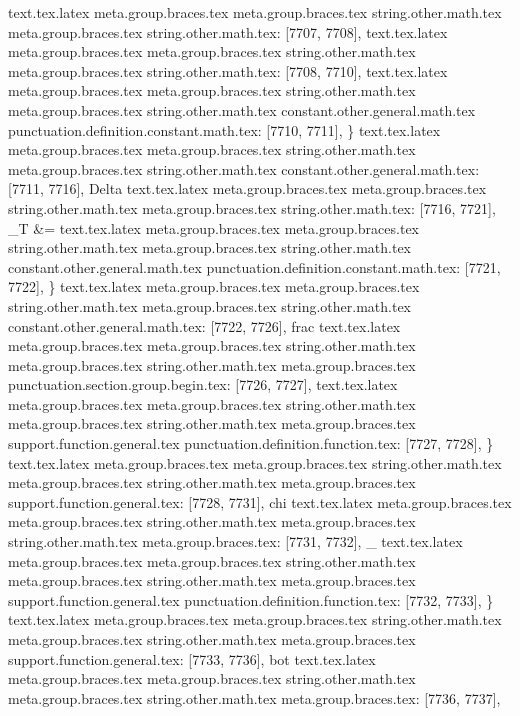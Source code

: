 {{{{{{{{{{{{{{{{{{{{{{{{{{{{{{{{{{{{{{{{{{{{{{{{{{{{{{{{{{{{{{{{{{{{{{{{{{{{{{{{{{{{{{{{{{{{{{{{{{{{{{{{{{{{{{{{{{{{{{{{{{{{{{{{{{{{{{{{{{{{{{{{{{{{{{{{{{{{{{{{{{{{{{{{{{{{{{{{{{{{{{{{{{{{{{{{{{{{{{{{{{{{{{{{{{{{{{{{{{{text.tex.latex meta.group.braces.tex meta.group.braces.tex string.other.math.tex meta.group.braces.tex string.other.math.tex: [7707, 7708], {
}
text.tex.latex meta.group.braces.tex meta.group.braces.tex string.other.math.tex meta.group.braces.tex string.other.math.tex: [7708, 7710], {  }
text.tex.latex meta.group.braces.tex meta.group.braces.tex string.other.math.tex meta.group.braces.tex string.other.math.tex constant.other.general.math.tex punctuation.definition.constant.math.tex: [7710, 7711], {\}
text.tex.latex meta.group.braces.tex meta.group.braces.tex string.other.math.tex meta.group.braces.tex string.other.math.tex constant.other.general.math.tex: [7711, 7716], {Delta}
text.tex.latex meta.group.braces.tex meta.group.braces.tex string.other.math.tex meta.group.braces.tex string.other.math.tex: [7716, 7721], {_T &=}
text.tex.latex meta.group.braces.tex meta.group.braces.tex string.other.math.tex meta.group.braces.tex string.other.math.tex constant.other.general.math.tex punctuation.definition.constant.math.tex: [7721, 7722], {\}
text.tex.latex meta.group.braces.tex meta.group.braces.tex string.other.math.tex meta.group.braces.tex string.other.math.tex constant.other.general.math.tex: [7722, 7726], {frac}
text.tex.latex meta.group.braces.tex meta.group.braces.tex string.other.math.tex meta.group.braces.tex string.other.math.tex meta.group.braces.tex punctuation.section.group.begin.tex: [7726, 7727], {{}
text.tex.latex meta.group.braces.tex meta.group.braces.tex string.other.math.tex meta.group.braces.tex string.other.math.tex meta.group.braces.tex support.function.general.tex punctuation.definition.function.tex: [7727, 7728], {\}
text.tex.latex meta.group.braces.tex meta.group.braces.tex string.other.math.tex meta.group.braces.tex string.other.math.tex meta.group.braces.tex support.function.general.tex: [7728, 7731], {chi}
text.tex.latex meta.group.braces.tex meta.group.braces.tex string.other.math.tex meta.group.braces.tex string.other.math.tex meta.group.braces.tex: [7731, 7732], {_}
text.tex.latex meta.group.braces.tex meta.group.braces.tex string.other.math.tex meta.group.braces.tex string.other.math.tex meta.group.braces.tex support.function.general.tex punctuation.definition.function.tex: [7732, 7733], {\}
text.tex.latex meta.group.braces.tex meta.group.braces.tex string.other.math.tex meta.group.braces.tex string.other.math.tex meta.group.braces.tex support.function.general.tex: [7733, 7736], {bot}
text.tex.latex meta.group.braces.tex meta.group.braces.tex string.other.math.tex meta.group.braces.tex string.other.math.tex meta.group.braces.tex: [7736, 7737], { }
}}}}}}}}}}}}}}}}}}}}}}}}}}}}}}}}}}}}}}}}}}}}}}}}}}}}}}}}}}}}}}}}}}}}}}}}}}}}}}}}}}}}}}}}}}}}}}}}}}}}}}}}}}}}}}}}}}}}}}}}}}}}}}}}}}}}}}}}}}}}}}}}}}}}}}}}}}}}}}}}}}}}}}}}}}}}}}}}}}}}}}}}}}}}}}}}}}}}}}}}}}}}}}}}}}}}}}}}}}}}}}}}

